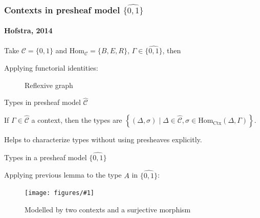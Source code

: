 \documentclass[english]{beamer}
\newcommand{\fig}[2]{
    \begin{figure}\begin{center}\texttt{[image: figures/\#1]}\caption{#2\label{#1}}\end{center}
    \end{figure}}
\newcommand{\tcol}[2]{
    \begin{columns}
        \column{.5\textwidth}
        #1
        \column{.5\textwidth}
        #2
    \end{columns}
}
\begin{document}
   \begin{frame}[fragile]
   \frametitle{Contexts in presheaf model $\widehat{\{0,1\}}$}
\framesubtitle{Hofstra, 2014}
    \begin{example}    
    Take $\mathcal{C} = \{0,1\}$ and $\text{Hom}_{\mathcal{C}}= \{B,E,R\}$, $\Gamma \in \widehat{\{0,1\}}$, then 
    
   
    
    Applying functorial identities:
    \begin{figure}
    \begin{centering}
        
    \end{centering}
    \caption{Reflexive graph}
    \end{figure}
   \end{example} 
\end{frame}

\begin{frame}{Types in  presheaf model $\widehat{\mathcal{C}}$}
    
    
    \begin{lemma}
        If $\Gamma \in \widehat{\mathcal{C}}$ a context, then the types are $ \left\{ (\Delta, \sigma) \mid \Delta \in \widehat{\mathcal{C}}, \sigma \in \text{Hom}_{\text{Ctx}}(\Delta , \Gamma) \right\}$.
     \end{lemma}

     
     Helps to characterize types without using presheaves explicitly.
\end{frame}


\begin{frame}{Types in a presheaf model $\widehat{\{0, 1 \}}$}
  \begin{example}
  Applying previous lemma to the type $A$ in $\widehat{\{0, 1 \}}$:
\fig{type_lemma}{Modelled by two contexts and a surjective morphism}
 \end{example}


\end{frame}
\end{document}
